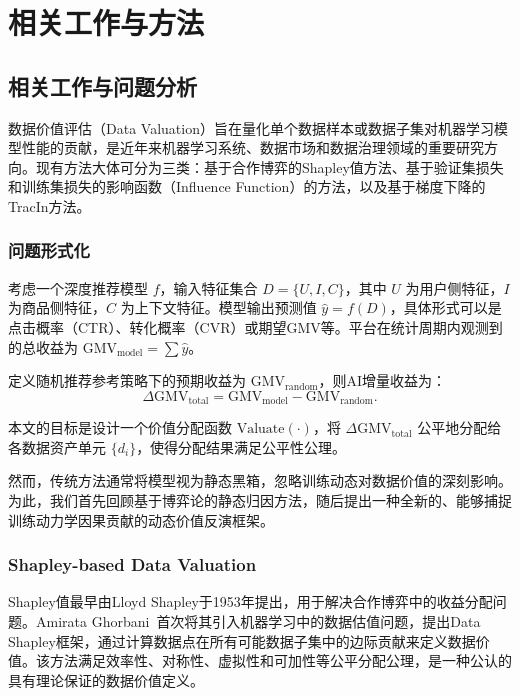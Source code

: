 
\chapter{相关工作与方法}


\section{相关工作与问题分析}
\label{sec:related}
数据价值评估（Data Valuation）旨在量化单个数据样本或数据子集对机器学习模型性能的贡献，是近年来机器学习系统、数据市场和数据治理领域的重要研究方向。现有方法大体可分为三类：基于合作博弈的Shapley值方法、基于验证集损失和训练集损失的影响函数（Influence Function）的方法，以及基于梯度下降的TracIn方法。

\subsection{问题形式化}
\label{sec:problem_formalization}
考虑一个深度推荐模型 $f$，输入特征集合 $D = \{U, I, C\}$，其中 $U$ 为用户侧特征，$I$ 为商品侧特征，$C$ 为上下文特征。模型输出预测值 $\hat{y} = f(D)$，具体形式可以是点击概率（CTR）、转化概率（CVR）或期望GMV等。平台在统计周期内观测到的总收益为 $\text{GMV}_{\text{model}} = \sum \hat{y}$。

定义随机推荐参考策略下的预期收益为 $\text{GMV}_{\text{random}}$，则AI增量收益为：
\[
\Delta\text{GMV}_{\text{total}} = \text{GMV}_{\text{model}} - \text{GMV}_{\text{random}}.
\]

本文的目标是设计一个价值分配函数 $\text{Valuate}(\cdot)$，将 $\Delta\text{GMV}_{\text{total}}$ 公平地分配给各数据资产单元 $\{d_i\}$，使得分配结果满足公平性公理。

然而，传统方法通常将模型视为静态黑箱，忽略训练动态对数据价值的深刻影响。为此，我们首先回顾基于博弈论的静态归因方法，随后提出一种全新的、能够捕捉训练动力学因果贡献的动态价值反演框架。

\subsection{Shapley-based Data Valuation}
Shapley值最早由Lloyd Shapley于1953年提出\cite{shapley1953value}，用于解决合作博弈中的收益分配问题。Amirata Ghorbani~\cite{ghorbani2019data}首次将其引入机器学习中的数据估值问题，提出Data Shapley框架，通过计算数据点在所有可能数据子集中的边际贡献来定义数据价值。该方法满足效率性、对称性、虚拟性和可加性等公平分配公理，是一种公认的具有理论保证的数据价值定义。

